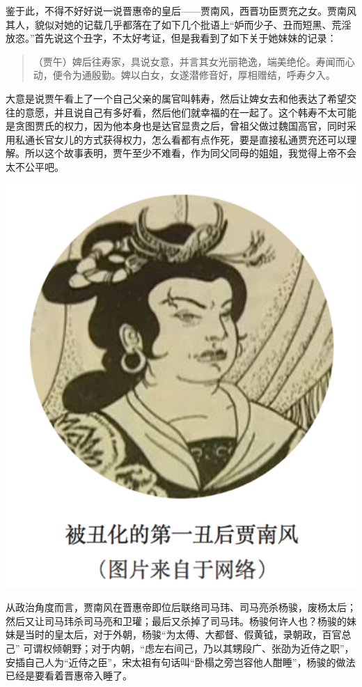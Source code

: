 \documentclass[]{book}
\begin{document}
鉴于此，不得不好好说一说晋惠帝的皇后------贾南风，西晋功臣贾充之女。贾南风其人，貌似对她的记载几乎都落在了如下几个批语上``妒而少子、丑而短黑、荒淫放恣。''首先说这个丑字，不太好考证，但是我看到了如下关于她妹妹的记录：

\begin{quote}
（贾午）婢后往寿家，具说女意，并言其女光丽艳逸，端美绝伦。寿闻而心动，便令为通殷勤。婢以白女，女遂潜修音好，厚相赠结，呼寿夕入。
\end{quote}

大意是说贾午看上了一个自己父亲的属官叫韩寿，然后让婢女去和他表达了希望交往的意愿，并且说自己有多好看，然后他们就幸福的在一起了。这个韩寿不太可能是贪图贾氏的权力，因为他本身也是达官显贵之后，曾祖父做过魏国高官，同时采用私通长官女儿的方式获得权力，怎么看都有点作死，要是直接私通贾充还可以理解。所以这个故事表明，贾午至少不难看，作为同父同母的姐姐，我觉得上帝不会太不公平吧。

\includegraphics[width=5.79in]{images/his7}

从政治角度而言，贾南风在晋惠帝即位后联络司马玮、司马亮杀杨骏，废杨太后；然后又让司马玮杀司马亮和卫瓘；最后又杀掉了司马玮。杨骏何许人也？杨骏的妹妹是当时的皇太后，对于外朝，杨骏``为太傅、大都督、假黄钺，录朝政，百官总己''
可谓权倾朝野；对于内朝，``虑左右间己，乃以其甥段广、张劭为近侍之职''，安插自己人为``近侍之臣''，宋太祖有句话叫``卧榻之旁岂容他人酣睡''，杨骏的做法已经是要看着晋惠帝入睡了。
\end{document}
